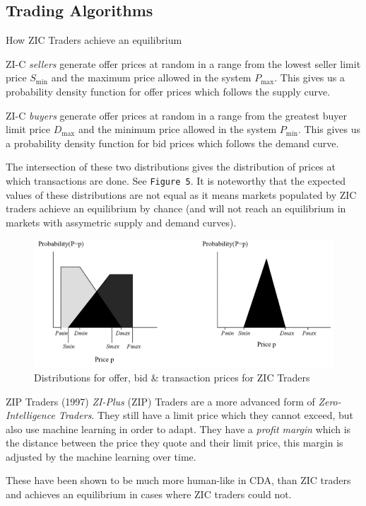 \documentclass[11pt,a4paper]{article}
\begin{document}
\subsection{Trading Algorithms}

  \begin{proposition}{How ZIC Traders achieve an equilibrium}
    \par ZI-C \textit{sellers} generate offer prices at random in a range from the lowest seller limit price $S_\text{min}$ and the maximum price allowed in the system $P_\text{max}$. This gives us a probability density function for offer prices which follows the supply curve.
    \par ZI-C \textit{buyers} generate offer prices at random in a range from the greatest buyer limit price $D_\text{max}$ and the minimum price allowed in the system $P_\text{min}$. This gives us a probability density function for bid prices which follows the demand curve.
    \par The intersection of these two distributions gives the distribution of prices at which transactions are done. See \texttt{Figure 5}. It is noteworthy that the expected values of these distributions are not equal as it means markets populated by ZIC traders achieve an equilibrium by chance (and will not reach an equilibrium in markets with assymetric supply and demand curves).
  \end{proposition}

  \begin{figure}[ht!]
    \centering
    \includegraphics[width=.5\textwidth]{ZICTransactions.PNG}
    \caption{Distributions for offer, bid \& transaction prices for ZIC Traders}
  \end{figure}

  \begin{proposition}{ZIP Traders (1997)}
    \textit{ZI-Plus} (ZIP) Traders are a more advanced form of \textit{Zero-Intelligence Traders}. They still have a limit price which they cannot exceed, but also use machine learning in order to adapt. They have a \textit{profit margin} which is the distance between the price they quote and their limit price, this margin is adjusted by the machine learning over time.
    \par These have been shown to be much more human-like in CDA, than ZIC traders and achieves an equilibrium in cases where ZIC traders could not.
  \end{proposition}
\end{document}

